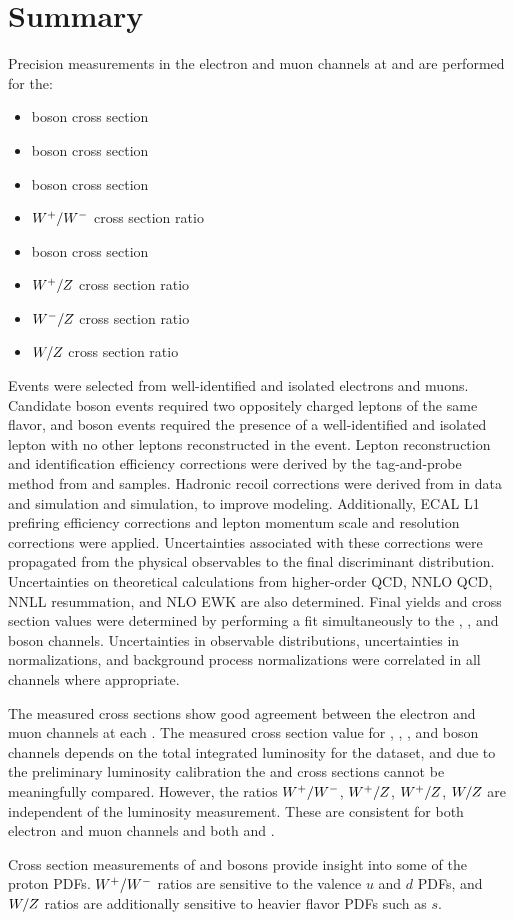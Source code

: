 \chapter{Summary}
Precision measurements in the electron and muon channels at \sg and \sh are performed for the:
\begin{itemize}
    \item \Wp boson cross section
    \item \Wm boson cross section
    \item \W boson cross section
    \item $W^+/W^-$ cross section ratio
    \item \Z boson cross section
    \item $W^+/Z$ cross section ratio
    \item $W^-/Z$ cross section ratio
    \item $W/Z$ cross section ratio
\end{itemize}
Events were selected from well-identified and isolated electrons and muons. Candidate \Z boson events required two oppositely charged leptons of the same flavor, and \W boson events required the presence of a well-identified and isolated lepton with no other leptons reconstructed in the event.
Lepton reconstruction and identification efficiency corrections were derived by the tag-and-probe method from \zee and \zmm samples. Hadronic recoil corrections were derived from \zmm in data and simulation and \wmunu simulation, to improve \met modeling. Additionally, ECAL L1 prefiring efficiency corrections and lepton momentum scale and resolution corrections were applied. Uncertainties associated with these corrections were propagated from the physical observables to the final discriminant distribution. Uncertainties on theoretical calculations from higher-order QCD, NNLO QCD, NNLL resummation, and NLO EWK are also determined.
Final yields and cross section values were determined by performing a fit simultaneously to the \Wp, \Wm, and \Z boson channels. Uncertainties in observable distributions, uncertainties in normalizations, and background process normalizations were correlated in all channels where appropriate.

The measured cross sections show good agreement between the electron and muon channels at each \s. The measured cross section value for \Wp, \Wm, \W, and \Z boson channels depends on the total integrated luminosity for the dataset, and due to the preliminary luminosity calibration the \sg and \sh cross sections cannot be meaningfully compared. However, the ratios $W^+/W^-$, $W^+/Z$, $W^+/Z$, $W/Z$ are independent of the luminosity measurement. These are consistent for both electron and muon channels and both \sg and \sh. 

Cross section measurements of \W and \Z bosons provide insight into some of the proton PDFs. $W^+/W^-$ ratios are sensitive to the valence $u$ and $d$ PDFs, and $W/Z$ ratios are additionally sensitive to heavier flavor PDFs such as $s$.